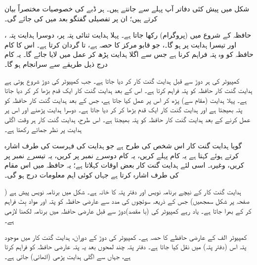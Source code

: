 شکل  میں پیش کئی دفاتر  آپ پہلے سے  جانتے ہیں۔  ہر ڈبے کی   خصوصیات مختصراً  بیان کرتے ہیں؛ ان پر تفصیلی گفتگو بعد میں کی جائے گی۔

حافظہ  کے شروع میں (پروگرام)  رکھا جاتا ہے۔ پہلا ہدایت ثنائی پتہ  پر، دوسرا ہدایت پتہ ، اور تیسرا ہدایت  پر ہو گا۔،  جو قابو مرکز کا حصہ ہے،  تا  گردان کرتا ہے۔ اس کا کام حافظہ کو وہ پتہ فراہم کرنا ہے جس سے اگلا ہدایت پڑھ کر عمل میں لایا جائے گا۔ یہ کام درج ذیل طریقے سے سرانجام ہو گا۔

کمپیوٹر کی ہر دوڑ  سے قبل ہدایت گنت کار     کر دیا جاتا ہے۔ جب کمپیوٹر کی دوڑ شروع  ہوتی ہے ہدایت گنت کار   حافظہ کو پتہ  فراہم کرتا ہے۔ اس کے بعد ہدایت گنت کار   ایک قدم بڑھا کر   کر دیا جاتا ہے۔ پہلا ہدایت (مقام  سے) پڑھ کر اس پر عمل کیا جاتا ہے، جس کے بعد ہدایت گنت کار حافظہ کو پتہ  بھیجتا ہے اور   ہدایت گنت کار ایک قدم بڑھا کر  کر دیا جاتا ہے۔ دوسرا ہدایت پڑھنے اور اس پر عمل کرنے کے بعد ہدایت گنت کار حافظہ کو  پتہ بھیجتا ہے۔ اس طرح، ہدایت گنت کار ہر وقت اگلی  ہدایت  پر نظر جمائے رکھتا ہے۔

گویا ہدایت گنت کار اس شخص کی طرح ہے جو ہدایت کی فہرست  کی طرف اشارہ کرتے ہوئے کہتا ہے یہ کام  پہلے کریں، یہ کام دوسرے نمبر پر کریں، یہ تیسرے نمبر پر کریں، وغیرہ۔ اسی لئے ہدایت گنت کار بعض اوقات  کہلاتا ہے؛ یہ حافظہ میں اس مقام کی طرف اشارہ کرتا ہے جہاں کوئی   اہم معلومات درج ہو گی۔

ہدایت گنت کار کے نیچے برنامہ نویس   اور دفتر پتہ کا  خانہ  ہے۔ شکل  میں برنامہ نویس پیش ہے (     صفحہ  پر شکل  سمجھیں)   جس  کے ذریعہ سوئچوں  کی مدد سے   عارضی حافظہ کو   پتہ اور  مواد   بِٹ فراہم کر  کے بھرا جاتا ہے۔ یاد رہے کمپیوٹر کی  (با مقصد)دوڑ سے قبل عارضی حافظہ میں برنامہ  لکھنا لازمی ہے۔

   کمپیوٹر  الف کے عارضی حافظے کا حصہ ہے۔ کمپیوٹر  کی دوڑ کے دوران، ہدایت گنت کار  میں موجود پتہ  اس   (دفتر پتہ)     میں  نقل  کیا جاتا ہے۔  دفتر پتہ   چند لمحوں بعد یہ پتہ عارضی  حافظہ کو فراہم کرتا ہے، جہاں سے   اگلی ہدایت پڑھی (اٹھائی)  جاتی ہے۔

